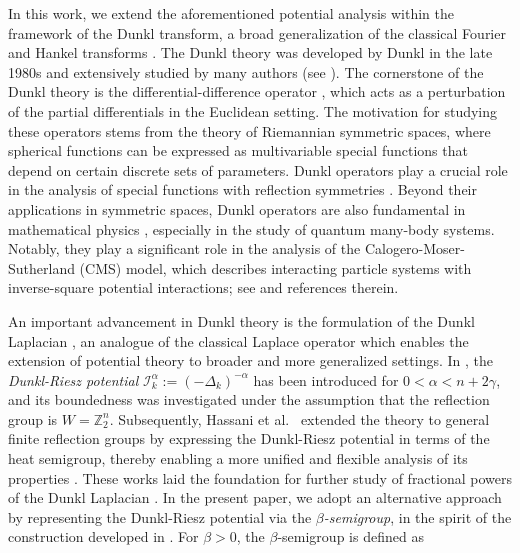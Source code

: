 \documentclass[11pt,a4paper,reqno]{amsproc}
\theoremstyle{definition}
\theoremstyle{remark}
\numberwithin{equation}{section}
\begin{document}
 In this work, we extend the aforementioned potential analysis within the framework of the Dunkl transform, a broad generalization of the classical Fourier and Hankel transforms  \cite{DJ1, D3}. The Dunkl theory was developed by Dunkl in the late 1980s and extensively studied by many authors (see \cite{DJ1, Rosler-98, Rosler-99, Rosler-2003}). The cornerstone of the Dunkl theory is the differential-difference operator \cite{D1}, which acts as a perturbation of the partial differentials in the Euclidean setting. The motivation for studying these operators stems from the theory of Riemannian symmetric spaces, where spherical functions can be expressed as multivariable special functions that depend on certain discrete sets of parameters. Dunkl operators play a crucial role in the analysis of special functions with reflection symmetries \cite{Rosler-2008}. Beyond their applications in symmetric spaces, Dunkl operators are also fundamental in mathematical physics \cite{Benchikha}, especially in the study of quantum many-body systems. Notably, they play a significant role in the analysis of the Calogero-Moser-Sutherland (CMS) model, which describes interacting particle systems with inverse-square potential interactions; see \cite{DV} and references therein.
 
An important advancement in Dunkl theory is the formulation of the Dunkl Laplacian \cite{D1}, an analogue of the classical Laplace operator which enables the extension of potential theory to broader and more generalized settings. In \cite{Xu}, the \emph{Dunkl-Riesz potential} \( \mathcal{I}_k^\alpha:= \left( -\Delta_k \right)^{-\alpha} \) has been introduced for \( 0 < \alpha < n + 2\gamma \), and its boundedness was investigated under the assumption that the reflection group is \( W = \mathbb{Z}_2^n \). Subsequently, Hassani et al.~\cite{Hassani} extended the theory to general finite reflection groups by expressing the Dunkl-Riesz potential in terms of the heat semigroup, thereby enabling a more unified and flexible analysis of its properties \cite{Gallardo}. These works laid the foundation for further study of fractional powers of the Dunkl Laplacian \cite{Ben-2025, Bouzeffour, Rejeb}.  
In the present paper, we adopt an alternative approach by representing the Dunkl-Riesz potential via the \emph{\( \beta \)-semigroup}, in the spirit of the construction developed in \cite{Sezer}. For $\beta>0$, the \( \beta \)-semigroup is defined as
\end{document}
